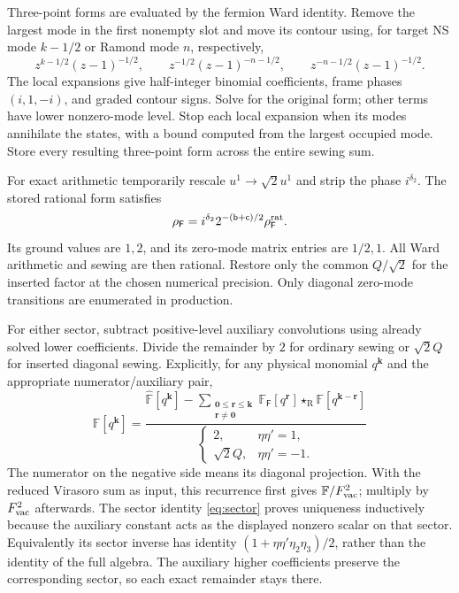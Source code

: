 \documentclass[11pt]{article}
\newcommand{\R}{\mathrm{R}}
\newcommand{\FF}{\mathbb F}
\newcommand{\hFF}{\widehat{\mathbb F}}
\newcommand{\st}{\star_{\R}}
\numberwithin{equation}{section}
\begin{document}
Three-point forms are evaluated by the fermion Ward identity. Remove the largest
mode in the first nonempty slot and move its contour using, for target NS
mode $k-1/2$ or Ramond mode $n$, respectively,
\begin{equation}
 z^{k-1/2}(z-1)^{-1/2},\qquad
 z^{-1/2}(z-1)^{-n-1/2},\qquad
 z^{-n-1/2}(z-1)^{-1/2}.
\end{equation}
The local expansions give half-integer binomial coefficients, frame phases
$(i,1,-i)$, and graded contour signs. Solve for the original form; other terms
have lower nonzero-mode level. Stop each local expansion when its modes
annihilate the states, with a bound computed from the largest occupied mode.
Store every resulting three-point form across the entire sewing sum.

For exact arithmetic temporarily rescale $u^1\to\sqrt2u^1$ and strip
the phase $i^{\delta_2}$. The stored rational form satisfies
\begin{equation}
 \rho_{\mathsf F}=i^{\delta_2}2^{-(\mathsf b+\mathsf c)/2}
                      \rho_{\mathsf F}^{\rm rat}.
\end{equation}
Its ground values are $1,2$, and its zero-mode matrix entries are $1/2,1$.
All Ward arithmetic and sewing are then rational. Restore only the common
$Q/\sqrt2$ for the inserted factor at the chosen numerical precision.
Only diagonal zero-mode transitions are enumerated in production.

For either sector, subtract positive-level auxiliary convolutions using already
solved lower coefficients. Divide the remainder by $2$ for ordinary sewing or
$\sqrt2Q$ for inserted diagonal sewing. Explicitly, for any physical monomial
$q^{\boldsymbol k}$ and the appropriate numerator/auxiliary pair,
\begin{equation}
 \FF[q^{\boldsymbol k}]=
 \frac{\hFF[q^{\boldsymbol k}]
 -\sum_{\substack{\boldsymbol0\le\boldsymbol r\le\boldsymbol k\\
                  \boldsymbol r\ne\boldsymbol0}}
       \FF_{\mathsf F}[q^{\boldsymbol r}]\st
       \FF[q^{\boldsymbol k-\boldsymbol r}]}{
       \begin{cases}2,&\eta\eta'=1,\\\sqrt2Q,&\eta\eta'=-1.\end{cases}}
 \label{eq:division}
\end{equation}
The numerator on the negative side means its diagonal projection. With the
reduced Virasoro sum as input, this recurrence first gives
$\FF/F_{\rm vac}^2$; multiply by $F_{\rm vac}^2$ afterwards.
The sector identity \eqref{eq:sector} proves uniqueness inductively because
the auxiliary constant acts as the displayed nonzero scalar on that sector.
Equivalently its sector inverse has identity
$(1+\eta\eta'\eta_2\eta_3)/2$, rather than the identity of the full algebra.
The auxiliary higher coefficients preserve the corresponding sector, so each
exact remainder stays there.
\end{document}
